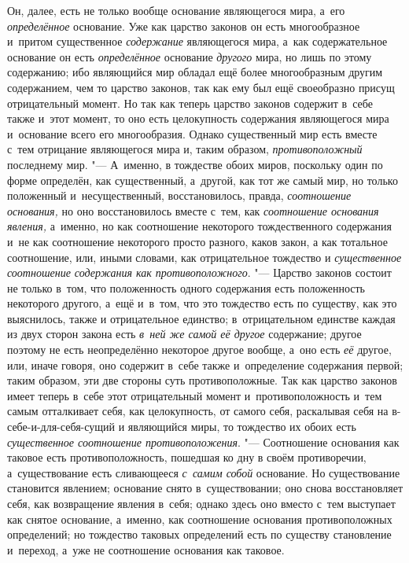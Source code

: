 Он, далее, есть не только вообще основание являющегося мира, а~его
{\em определённое} основание. Уже как царство законов
он есть многообразное и~притом существенное
{\em содержание} являющегося мира, а~как содержательное
основание он есть {\em определённое} основание
{\em другого} мира, но лишь по этому содержанию; ибо
являющийся мир обладал ещё более многообразным другим содержанием, чем то
царство законов, так как ему был ещё своеобразно присущ отрицательный
момент. Но так как теперь царство законов содержит в~себе также и~этот
момент, то оно есть целокупность содержания являющегося мира и~основание
всего его многообразия. Однако существенный мир есть вместе с~тем отрицание
являющегося мира и, таким образом,
{\em противоположный} последнему мир. "--- А~именно, в
тождестве обоих миров, поскольку один по форме определён, как существенный,
а~другой, как тот же самый мир, но только положенный и~несущественный,
восстановилось, правда, {\em соотношение основания,} но
оно восстановилось вместе с~тем, как {\em соотношение
основания явления,} а~именно, но как соотношение некоторого тождественного
содержания и~не как соотношение некоторого просто разного, каков закон, а
как тотальное соотношение, или, иными словами, как отрицательное тождество
и {\em существенное соотношение содержания как
противоположного}. "--- Царство законов состоит не только в~том, что
положенность одного содержания есть положенность некоторого другого, а~ещё
и~в~том, что это тождество есть по существу, как это выяснилось, также и
отрицательное единство; в~отрицательном единстве каждая из двух сторон
закона есть {\em в~ней же самой её другое} содержание;
другое поэтому не есть неопределённо некоторое другое вообще, а~оно есть
{\em её} другое, или, иначе говоря, оно содержит в~себе
также и~определение содержания первой; таким образом, эти две стороны суть
противоположные. Так как царство законов имеет теперь в~себе этот
отрицательный момент и~противоположность и~тем самым отталкивает себя, как
целокупность, от самого себя, раскалывая себя на в-себе-и-для-себя-сущий и
являющийся миры, то тождество их обоих есть
{\em существенное соотношение противоположения}. "---
Соотношение основания как таковое есть противоположность, пошедшая ко дну в
своём противоречии, а~существование есть сливающееся
{\em с~самим собой} основание. Но существование
становится явлением; основание снято в~существовании; оно снова
восстановляет себя, как возвращение явления в~себя; однако здесь оно вместо
с~тем выступает как снятое основание, а~именно, как соотношение основания
противоположных определений; но тождество таковых определений есть по
существу становление и~переход, а~уже не соотношение основания как таковое.


